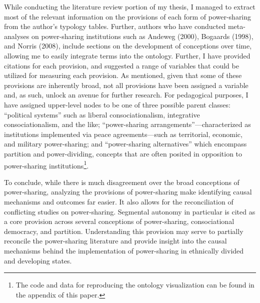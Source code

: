 \documentclass[12pt]{article}
\begin{document}
While conducting the literature review portion of my thesis, I managed to extract most of the relevant information on the provisions of each form of power-sharing from the author’s typology tables. Further, authors who have conducted meta-analyses on power-sharing institutions such as Andeweg (2000), Bogaards (1998), and Norris (2008), include sections on the development of conceptions over time, allowing me to easily integrate terms into the ontology. Further, I have provided citations for each provision, and suggested a range of variables that could be utilized for measuring each provision. As mentioned, given that some of these provisions are inherently broad, not all provisions have been assigned a variable and, as such, unlock an avenue for further research. For pedagogical purposes, I have assigned upper-level nodes to be one of three possible parent classes: ``political systems'' such as liberal consociationalism, integrative consociationalism, and the like; ``power-sharing arrangements''---characterized as institutions implemented via peace agreements---such as territorial, economic, and military power-sharing; and ``power-sharing alternatives'' which encompass partition and power-dividing, concepts that are often posited in opposition to power-sharing institutions\footnote{The code and data for reproducing the ontology visualization can be found in the appendix of this paper.}.

To conclude, while there is much disagreement over the broad conceptions of power-sharing, analyzing the provisions of power-sharing make identifying causal mechanisms and outcomes far easier. It also allows for the reconciliation of conflicting studies on power-sharing. Segmental autonomy in particular is cited as a core provision across several conceptions of power-sharing, consociational democracy, and partition. Understanding this provision may serve to partially reconcile the power-sharing literature and provide insight into the causal mechanisms behind the implementation of power-sharing in ethnically divided and developing states. 
\end{document}
